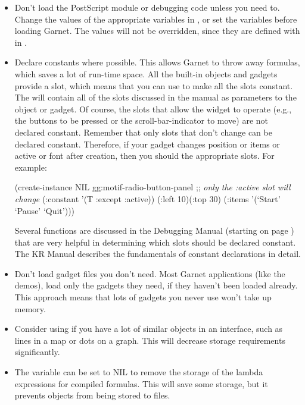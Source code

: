 \begin{itemize}
\item Don't load the PostScript module or debugging code unless you need to.
Change the values of the appropriate variables in ,
or set the variables before loading Garnet.  The values will not be overridden,
since they are defined with  in .

\item 
Declare constants where possible.  This allows Garnet to throw away
formulas, which saves a lot of run-time space.  All the built-in objects and
gadgets provide a  slot, which means that you can
use  to make all the slots constant.
The  will contain all of the slots discussed in the
manual as parameters to the object or gadget.  Of course, the slots
that allow the widget to operate (e.g., the buttons to be pressed or
the scroll-bar-indicator to move) are not declared constant.
Remember that only slots that don't change can be declared constant.
Therefore, if your gadget changes position or items or active or font after
creation, then you should  the appropriate slots.  For
example:
\begin{programexample}
(create-instance NIL gg:motif-radio-button-panel
  ;; {\it only the :active slot will change}
  (:constant '(T :except :active))
  (:left 10)(:top 30)
  (:items '(`Start' `Pause' `Quit')))
\end{programexample}
Several functions are discussed in the Debugging Manual (starting on page
\value{debug}) that are very helpful in determining which slots should be
declared constant.  The KR Manual describes the fundamentals of
constant declarations in detail.


\item Don't load gadget files you don't need.  Most Garnet applications
(like the demos), load only the gadgets they need, if they haven't
been loaded already.  This approach means that lots of gadgets you
never use won't take up memory.

\item Consider using  if you have a lot of similar
objects in an interface, such as lines in a map or dots on a graph.
This will decrease storage requirements significantly.

\item The variable  can be set to NIL to remove the
storage of the lambda expressions for compiled formulas.  This will
save some storage, but it prevents objects from being stored to files.

\end{itemize}


